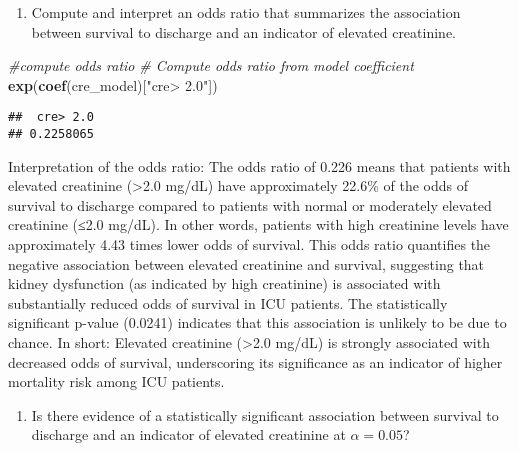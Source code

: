 \documentclass[
]{article}
\newenvironment{Shaded}{\begin{snugshade}}{\end{snugshade}}
\newcommand{\AttributeTok}[1]{\textcolor[rgb]{0.13,0.29,0.53}{#1}}
\newcommand{\CommentTok}[1]{\textcolor[rgb]{0.56,0.35,0.01}{\textit{#1}}}
\newcommand{\FunctionTok}[1]{\textcolor[rgb]{0.13,0.29,0.53}{\textbf{#1}}}
\newcommand{\NormalTok}[1]{#1}
\newcommand{\OtherTok}[1]{\textcolor[rgb]{0.56,0.35,0.01}{#1}}
\newcommand{\SpecialCharTok}[1]{\textcolor[rgb]{0.81,0.36,0.00}{\textbf{#1}}}
\newcommand{\StringTok}[1]{\textcolor[rgb]{0.31,0.60,0.02}{#1}}
\providecommand{\tightlist}{%
  \setlength{\itemsep}{0pt}\setlength{\parskip}{0pt}}
\begin{document}
\begin{enumerate}
\def\labelenumi{\alph{enumi})}
\setcounter{enumi}{2}
\tightlist
\item
  Compute and interpret an odds ratio that summarizes the association
  between survival to discharge and an indicator of elevated creatinine.
\end{enumerate}

\begin{Shaded}
\begin{Highlighting}[]
\CommentTok{\#compute odds ratio}
\CommentTok{\# Compute odds ratio from model coefficient}
\FunctionTok{exp}\NormalTok{(}\FunctionTok{coef}\NormalTok{(cre\_model)[}\StringTok{"cre\textgreater{} 2.0"}\NormalTok{])}
\end{Highlighting}
\end{Shaded}

\begin{verbatim}
##  cre> 2.0 
## 0.2258065
\end{verbatim}

Interpretation of the odds ratio: The odds ratio of 0.226 means that
patients with elevated creatinine (\textgreater2.0 mg/dL) have
approximately 22.6\% of the odds of survival to discharge compared to
patients with normal or moderately elevated creatinine (≤2.0 mg/dL). In
other words, patients with high creatinine levels have approximately
4.43 times lower odds of survival. This odds ratio quantifies the
negative association between elevated creatinine and survival,
suggesting that kidney dysfunction (as indicated by high creatinine) is
associated with substantially reduced odds of survival in ICU patients.
The statistically significant p-value (0.0241) indicates that this
association is unlikely to be due to chance. In short: Elevated
creatinine (\textgreater2.0 mg/dL) is strongly associated with decreased
odds of survival, underscoring its significance as an indicator of
higher mortality risk among ICU patients.

\begin{enumerate}
\def\labelenumi{\alph{enumi})}
\setcounter{enumi}{3}
\tightlist
\item
  Is there evidence of a statistically significant association between
  survival to discharge and an indicator of elevated creatinine at
  \(\alpha = 0.05\)?
\end{enumerate}

\begin{Shaded}
\end{Shaded}
\end{document}
